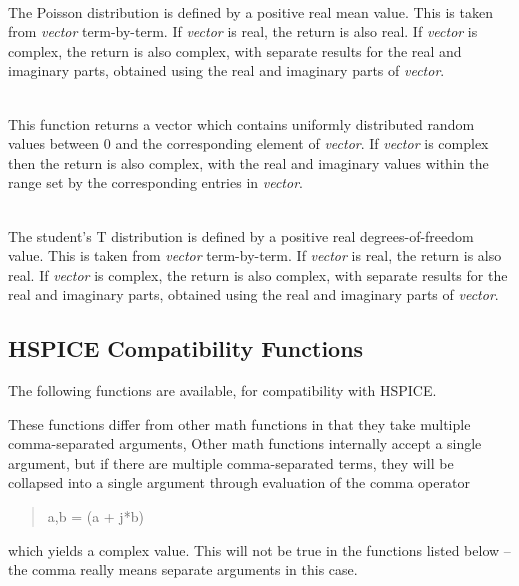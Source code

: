 \begin{description}
\item{}\\
The Poisson distribution is defined by a positive real mean value. 
This is taken from {\it vector} term-by-term.  If {\it vector} is
real, the return is also real.  If {\it vector} is complex, the return
is also complex, with separate results for the real and imaginary
parts, obtained using the real and imaginary parts of {\it vector}.

\item{}\\
This function returns a vector which contains uniformly distributed
random values between 0 and the corresponding element of {\it
vector\/}.  If {\it vector} is complex then the return is also
complex, with the real and imaginary values within the range set by
the corresponding entries in {\it vector}.

\item{}\\
The student's T distribution is defined by a positive real
degrees-of-freedom value.  This is taken from {\it vector}
term-by-term.  If {\it vector} is real, the return is also real.  If
{\it vector} is complex, the return is also complex, with separate
results for the real and imaginary parts, obtained using the real and
imaginary parts of {\it vector}.
\end{description}


\subsection{HSPICE Compatibility Functions}


The following functions are available, for compatibility with HSPICE.

These functions differ from other math functions in that they take
multiple comma-separated arguments, Other math functions
internally accept a single argument, but if there are multiple
comma-separated terms, they will be collapsed into a single
argument through evaluation of the comma operator
\begin{quote}
\vt a,b = (a + j*b)
\end{quote}
which yields a complex value.  This will not be true in the functions
listed below -- the comma really means separate arguments in this
case.

